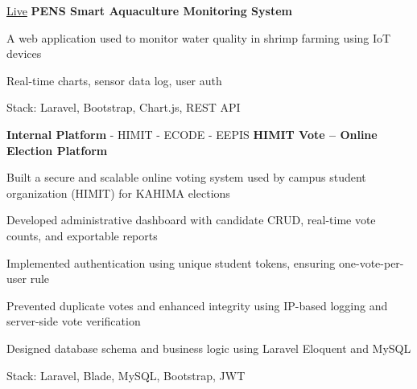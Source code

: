 \vspace{0.3 cm}


\begin{twocolentrylink}{
		\href{https://aquaculturepens.com/}{Live}
	}
	\textbf{PENS Smart Aquaculture Monitoring System}
\end{twocolentrylink}
\begin{onecolentry}
	\begin{highlights}
		\item A web application used to monitor water quality in shrimp farming using IoT devices
		\item Real-time charts, sensor data log, user auth
		\item Stack: Laravel, Bootstrap, Chart.js, REST API
	\end{highlights}
\end{onecolentry}

\vspace{0.3 cm}


\begin{twocolentrylink}{
		\textbf{Internal Platform} - HIMIT - ECODE - EEPIS
	}
	\textbf{HIMIT Vote -- Online Election Platform}
\end{twocolentrylink}
\begin{onecolentry}
	\begin{highlights}
		\item Built a secure and scalable online voting system used by campus student organization (HIMIT) for KAHIMA elections
		\item Developed administrative dashboard with candidate CRUD, real-time vote counts, and exportable reports
		\item Implemented authentication using unique student tokens, ensuring one-vote-per-user rule
		\item Prevented duplicate votes and enhanced integrity using IP-based logging and server-side vote verification
		\item Designed database schema and business logic using Laravel Eloquent and MySQL
		\item Stack: Laravel, Blade, MySQL, Bootstrap, JWT
	\end{highlights}
\end{onecolentry}

\vspace{0.3 cm}


